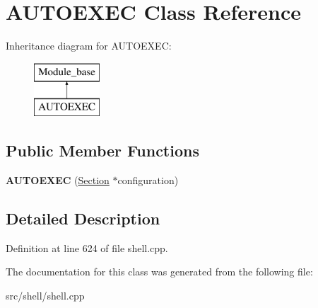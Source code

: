 \hypertarget{classAUTOEXEC}{\section{A\-U\-T\-O\-E\-X\-E\-C Class Reference}
\label{classAUTOEXEC}
}
Inheritance diagram for A\-U\-T\-O\-E\-X\-E\-C\-:\begin{figure}[H]
\begin{center}
\leavevmode
\includegraphics[height=2.000000cm]{classAUTOEXEC}
\end{center}
\end{figure}
\subsection*{Public Member Functions}
\begin{DoxyCompactItemize}
\item 
\hypertarget{classAUTOEXEC_a0c36ab7cc15d2e8ed2fc590cafc89672}{{\bfseries A\-U\-T\-O\-E\-X\-E\-C} (\hyperlink{classSection}{Section} $\ast$configuration)}\label{classAUTOEXEC_a0c36ab7cc15d2e8ed2fc590cafc89672}

\end{DoxyCompactItemize}


\subsection{Detailed Description}


Definition at line 624 of file shell.\-cpp.



The documentation for this class was generated from the following file\-:\begin{DoxyCompactItemize}
\item 
src/shell/shell.\-cpp\end{DoxyCompactItemize}
